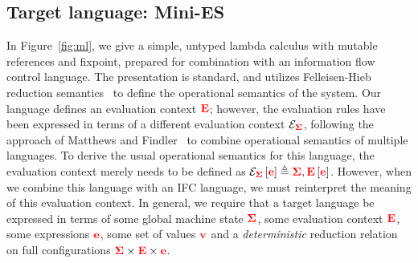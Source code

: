 \documentclass{sigplanconf}
\begin{document}
\subsection{Target language: Mini-ES}

In Figure~\ref{fig:ml}, we give a simple, untyped lambda calculus with
mutable references and fixpoint, prepared for combination with an
information flow control language.  The presentation is standard, and utilizes Felleisen-Hieb reduction
semantics~\cite{Felleisen:1992:RRS:136293.136297} to define the
operational semantics of the system.  Our language defines an evaluation
context \ensuremath{\tar{E}}; however, the evaluation rules have been expressed in terms
of a different evaluation context \ensuremath{\mathcal{E}_{\tar{\Sigma}}},
following the approach of Matthews and
Findler~\cite{Matthews:2007:OSM:1190216.1190220} to combine operational
semantics of multiple languages.  To
derive the usual operational semantics for this language, the evaluation
context merely needs to be defined as \ensuremath{\mathcal{E}_{\tar{\Sigma}}\left[\tar{e}\right]\triangleq{}\tar{\Sigma},\tar{E}\left[\tar{e}\right]}.
However, when we combine this language with an IFC language, we must
reinterpret the meaning of this evaluation context.
In general, we require that a target language be expressed in terms
of some global machine state \ensuremath{\tar{\Sigma}}, some evaluation context \ensuremath{\tar{E}},
some expressions \ensuremath{\tar{e}}, some set of values \ensuremath{\tar{v}} and a \emph{deterministic}
reduction relation on full configurations $\mathbf{\color{red} \Sigma} \times \mathbf{\color{red} E} \times \mathbf{\color{red} e}$.
\end{document}
